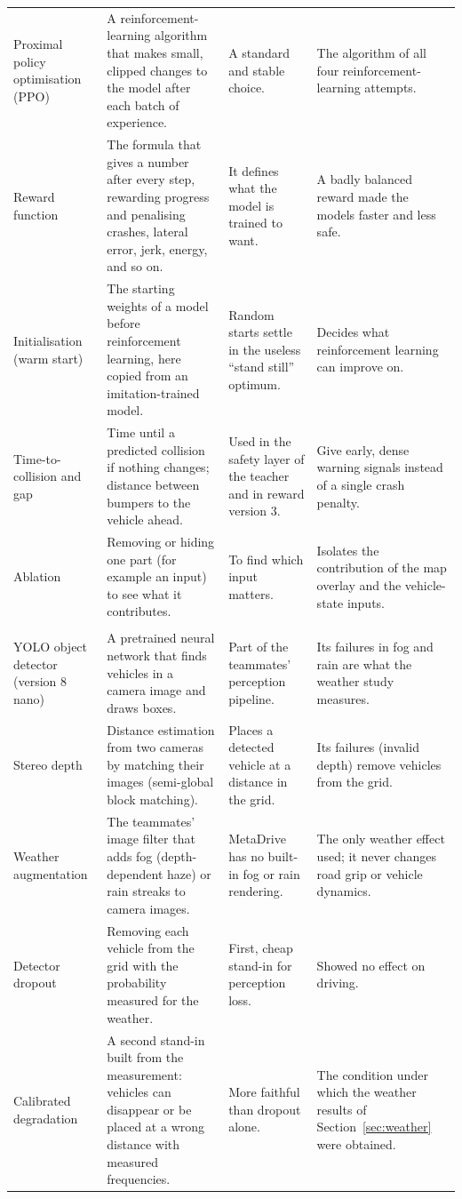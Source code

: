 {\begin{longtable}{@{}>{\raggedright\arraybackslash}p{3.1cm}>{\raggedright\arraybackslash}p{4.6cm}>{\raggedright\arraybackslash}p{3.7cm}>{\raggedright\arraybackslash}p{4.0cm}@{}}
Proximal policy optimisation (PPO) & A reinforcement-learning algorithm that makes small, clipped changes to the model after each batch of experience. & A standard and stable choice. & The algorithm of all four reinforcement-learning attempts.\\
Reward function & The formula that gives a number after every step, rewarding progress and penalising crashes, lateral error, jerk, energy, and so on. & It defines what the model is trained to want. & A badly balanced reward made the models faster and less safe.\\
Initialisation (warm start) & The starting weights of a model before reinforcement learning, here copied from an imitation-trained model. & Random starts settle in the useless ``stand still'' optimum. & Decides what reinforcement learning can improve on.\\
Time-to-collision and gap & Time until a predicted collision if nothing changes; distance between bumpers to the vehicle ahead. & Used in the safety layer of the teacher and in reward version 3. & Give early, dense warning signals instead of a single crash penalty.\\
Ablation & Removing or hiding one part (for example an input) to see what it contributes. & To find which input matters. & Isolates the contribution of the map overlay and the vehicle-state inputs.\\
\multicolumn{4}{@{}l}{\textbf{Perception and weather}}\\
YOLO object detector (version 8 nano) & A pretrained neural network that finds vehicles in a camera image and draws boxes. & Part of the teammates' perception pipeline. & Its failures in fog and rain are what the weather study measures.\\
Stereo depth & Distance estimation from two cameras by matching their images (semi-global block matching). & Places a detected vehicle at a distance in the grid. & Its failures (invalid depth) remove vehicles from the grid.\\
Weather augmentation & The teammates' image filter that adds fog (depth-dependent haze) or rain streaks to camera images. & MetaDrive has no built-in fog or rain rendering. & The only weather effect used; it never changes road grip or vehicle dynamics.\\
Detector dropout & Removing each vehicle from the grid with the probability measured for the weather. & First, cheap stand-in for perception loss. & Showed no effect on driving.\\
Calibrated degradation & A second stand-in built from the measurement: vehicles can disappear or be placed at a wrong distance with measured frequencies. & More faithful than dropout alone. & The condition under which the weather results of Section~\ref{sec:weather} were obtained.\\

\end{longtable}}

